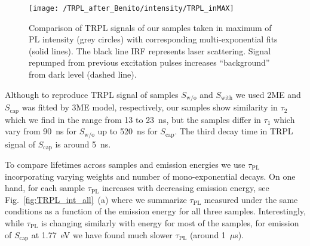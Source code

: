 
\begin{figure}[!ht]
	\centering
	\texttt{[image: /TRPL\_after\_Benito/intensity/TRPL\_inMAX]}
	\caption{Comparison of TRPL signals of our samples taken in maximum of PL intensity (grey circles) with corresponding multi-exponential fits (solid lines). The black line IRF represents laser scattering. Signal repumped from previous excitation pulses increases \enquote{background} from dark level (dashed line).}
	\label{fig:TRPL_int_all_max}
\end{figure}

%
%

%
Although to reproduce TRPL signal of samples $S_\mathrm{w/o}$ and $S_\mathrm{with}$ we used 2ME and $S_\mathrm{cap}$ was fitted by 3ME model, respectively, our samples show similarity in $\tau_2$ which we find in the range from 13 to 23~ns, but the samples differ in $\tau_1$ which vary from 90~ns for $S_\mathrm{w/o}$ up to 520~ns for $S_\mathrm{cap}$. The third decay time in TRPL signal of $S_\mathrm{cap}$ is around 5~ns.

To compare lifetimes across samples and emission energies we use $\tau_\mathrm{PL}$ incorporating varying weights and number of mono-exponential decays. On one hand, for each sample $\tau_\mathrm{PL}$ increases with decreasing emission energy, see Fig.~\ref{fig:TRPL_int_all}~(a) where we summarize $\tau_\mathrm{PL}$ measured under the same conditions as a function of the emission energy for all three samples. Interestingly, while $\tau_\mathrm{PL}$ is changing similarly with energy for most of the samples, for emission of $S_\mathrm{cap}$ at 1.77~eV we have found much slower $\tau_\mathrm{PL}$ (around 1~$\mu$s).

